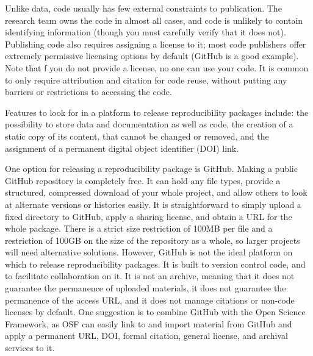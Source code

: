 Unlike data, code usually has few external constraints to publication.
The research team owns the code in almost all cases,
and code is unlikely to contain identifying information
(though you must carefully verify that it does not).
Publishing code also requires assigning a license to it;
most code publishers offer extremely permissive licensing options by default (GitHub is a good example).
Note that f you do not provide a license, no one can use your code.
It is common to only require attribution and citation for code reuse,
without putting any barriers or restrictions to accessing the code.

Features to look for in a platform to release reproducibility packages include:
the possibility to store data and documentation as well as code,
the creation of a static copy of its content, that cannot be changed or removed,
and the assignment of a permanent digital object identifier (DOI) link.

One option for releasing a reproducibility package is GitHub.
Making a public GitHub repository is completely free.
It can hold any file types,
provide a structured, compressed download of your whole project,
and allow others to look at alternate versions or histories easily.
It is straightforward to simply upload a fixed directory to GitHub,
apply a sharing license, and obtain a URL for the whole package.
There is a strict size restriction of 100MB per file and
a restriction of 100GB on the size of the repository as a whole,
so larger projects will need alternative solutions.
However, GitHub is not the ideal platform on which to release reproducibility packages.
It is built to version control code, and to facilitate collaboration on it.
It is not an archive, meaning that it does not guarantee the permanence
of uploaded materials, it does not guarantee the permanence of the access URL,
and it does not manage citations or non-code licenses by default.
One suggestion is to combine GitHub with the Open Science Framework,
as OSF can easily link to and import material from GitHub and
apply a permanent URL, DOI, formal citation, general license, and archival services to it.

